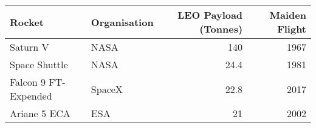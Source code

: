 \begin{tabular}{llrr}
    \hline
     Rocket               & Organisation   &   LEO Payload (Tonnes) &   Maiden Flight \\
    \hline
     Saturn V             & NASA           &                  140   &            1967 \\
     Space Shuttle        & NASA           &                   24.4 &            1981 \\
     Falcon 9 FT-Expended & SpaceX         &                   22.8 &            2017 \\
     Ariane 5 ECA         & ESA            &                   21   &            2002 \\
    \hline
\end{tabular}